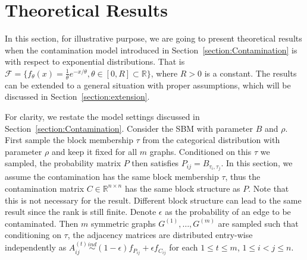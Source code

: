 \documentclass[a4paper]{article}
\begin{document}

\section{Theoretical Results}
\label{section:theory}
In this section, for illustrative purpose, we are going to present theoretical results when the contamination model introduced in Section~\ref{section:Contamination} is with respect to exponential distributions. That is $\mathcal{F} = \{ f_{\theta}(x) = \frac{1}{\theta} e^{-x/\theta}, \theta \in [0, R] \subset \mathbb{R} \}$, where $R > 0$ is a constant. The results can be extended to a general situation with proper assumptions, which will be discussed in Section~\ref{section:extension}.

For clarity, we restate the model settings discussed in Section~\ref{section:Contamination}. Consider the SBM with parameter $B$ and $\rho$. First sample the block membership $\tau$ from the categorical distribution with parameter $\rho$ and keep it fixed for all $m$ graphs. Conditioned on this $\tau$ we sampled, the probability matrix $P$ then satisfies $P_{ij} = B_{\tau_i, \tau_j}$. In this section, we assume the contamination has the same block membership $\tau$, thus the contamination matrix $C \in \mathbb{R}^{n \times n}$ has the same block structure as $P$. Note that this is not necessary for the result. Different block structure can lead to the same result since the rank is still finite. Denote $\epsilon$ as the probability of an edge to be contaminated. Then $m$ symmetric graphs $G^{(1)}, \dotsc, G^{(m)}$  are sampled such that conditioning on $\tau$, the adjacency matrices are distributed entry-wise independently as $A^{(t)}_{ij} \stackrel{ind}{\sim} (1-\epsilon) f_{P_{ij}} + \epsilon f_{C_{ij}}$ for each $1 \le t \le m$, $1 \le i < j \le n$. 
\end{document}
